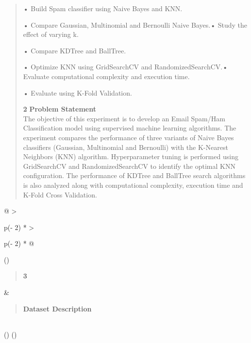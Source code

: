 \documentclass[
]{article}
\begin{document}
\begin{quote}
• Build Spam classifier using Naive Bayes and KNN.

• Compare Gaussian, Multinomial and Bernoulli Naive Bayes.• Study the
effect of varying k.

• Compare KDTree and BallTree.

• Optimize KNN using GridSearchCV and RandomizedSearchCV.• Evaluate
computational complexity and execution time.

• Evaluate using K-Fold Validation.

\textbf{2} \textbf{Problem Statement}\\
The objective of this experiment is to develop an Email Spam/Ham
Classification model using supervised machine learning algorithms. The
experiment compares the performance of three variants of Naive Bayes
classifiers (Gaussian, Multinomial and Bernoulli) with the K-Nearest
Neighbors (KNN) algorithm. Hyperparameter tuning is performed using
GridSearchCV and RandomizedSearchCV to identify the optimal KNN
configuration. The performance of KDTree and BallTree search algorithms
is also analyzed along with computational complexity, execution time and
K-Fold Cross Validation.
\end{quote}

\begin{longtable}[]{@{}
  >{\raggedright\arraybackslash}p{(\columnwidth - 2\tabcolsep) * }
  >{\raggedright\arraybackslash}p{(\columnwidth - 2\tabcolsep) * }@{}}
\toprule()
\begin{minipage}[b]{\linewidth}\raggedright
\begin{quote}
\textbf{3}
\end{quote}
\end{minipage} & \begin{minipage}[b]{\linewidth}\raggedright
\begin{quote}
\textbf{Dataset Description}
\end{quote}
\end{minipage} \\
\midrule()
\endhead
\bottomrule()
\end{longtable}
\end{document}
